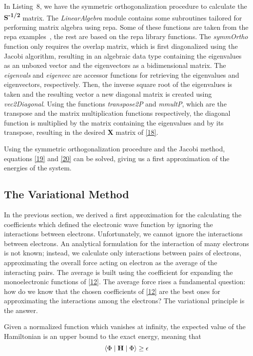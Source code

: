 \documentclass{tmr}
\begin{document}
In Listing~8, we have the symmetric orthogonalization procedure to calculate
the \textbf{S\textsuperscript{-1/2}} matrix. The \textit{LinearAlgebra} module 
contains some subroutines tailored for performing matrix algebra using repa.
Some of these functions are taken from the repa examples~\cite{repaExam},
the rest are based on the repa library functions. The \textit{symmOrtho} 
function only requires the overlap matrix, which is first diagonalized using 
the Jacobi algorithm, resulting in an algebraic data type containing the eigenvalues
as an unboxed vector and the eigenvectors as a bidimensional matrix. The \textit{eigenvals}
and \textit{eigenvec} are accessor functions
for retrieving the eigenvalues and eigenvectors, respectively.
Then, the inverse square root of the eigenvalues is taken and the resulting vector
a new diagonal matrix is created using \textit{vec2Diagonal}. Using the functions \textit{transpose2P} and \textit{mmultP}, which are
the transpose and the matrix multiplication functions respectively, the diagonal
function is multiplied by the matrix containing the eigenvalues and by its transpose,
resulting in the desired \textbf{X} matrix of \eqref{18}.

Using the symmetric orthogonalization procedure and the Jacobi method, equations \eqref{19}
and \eqref{20} can be solved, giving us a first approximation of the energies of the system.


\subsection{The Variational Method}

In the previous section, we derived a first approximation for the calculating the coefficients
which defined the electronic wave function by ignoring the interactions between
electrons. Unfortunately, we cannot ignore the interactions 
between electrons. An analytical formulation for the interaction
of many electrons is not known; instead, we calculate only
interactions between pairs of electrons, approximating the overall
force acting on electron as
the average of the interacting pairs. The average is built using the coefficient
for expanding the monoelectronic functions of \eqref{12}. The average force
rises a fundamental question: how do we know that the chosen coefficients of \eqref{12}
are the best ones for approximating the interactions among the electrons? The variational
principle is the answer.

\begin{theorem}
Given a normalized function \textPhi which vanishes at infinity, the expected value
of the Hamiltonian is an upper bound to the exact energy, meaning that
\[ \braket{\Phi \mid \mathbf{H} \mid \Phi} \geq \epsilon \] 
\end{theorem}
\end{document}
